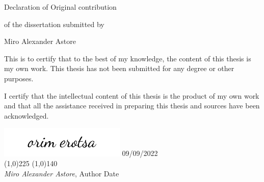 \newpage
\begin{center}
Declaration of Original contribution

\vspace{0.5in}

of the dissertation submitted by

\vspace{0.25in}

Miro Alexander Astore

\end{center}

\vspace{0.5in}

\noindent This is to certify that to the best of my knowledge, the content of this 
thesis is my own work. This thesis has not been submitted for any degree or other 
purposes.

\noindent I certify that the intellectual content of this thesis is the product of 
my own work and that all the assistance received in preparing this thesis and sources 
have been acknowledged.

\vspace{1in}


\includegraphics[width=6cm]{figures/signatures/orim_sig_fake.png} \hspace{3.0cm} 09/09/2022\\
\noindent \line(1,0){225} \hspace{1.0cm} \line(1,0){140} \\
 {\em Miro Alexander Astore}, Author \hspace{3.65cm} Date

